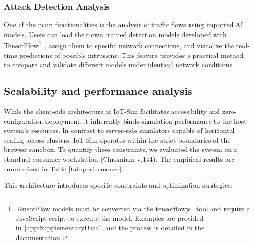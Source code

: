\subsubsection{Attack Detection Analysis}
\label{subsubsec:AttackDetectionAnalysis}
One of the main functionalities is the analysis of traffic flows using imported AI models. Users can load their own trained detection models developed with TensorFlow\footnote{TensorFlow models must be converted via the tensorflowjs~\cite{tensorflowjs} tool and require a JavaScript script to execute the model. Examples are provided in~\ref{app:SupplementaryData}, and the process is detailed in the documentation.}~\cite{tensorflow}, assign them to specific network connections, and visualize the real-time predictions of possible intrusions. This feature provides a practical method to compare and validate different models under identical network conditions.

\subsection{Scalability and performance analysis}
\label{subsec:ScalabilityPerformance}
While the client-side architecture of IoT-Sim facilitates accessibility and zero-configuration deployment, it inherently binds simulation performance to the host system's resources. In contrast to server-side simulators capable of horizontal scaling across clusters, IoT-Sim operates within the strict boundaries of the browser sandbox. To quantify these constraints, we evaluated the system on a standard consumer workstation (Chromium v.144). The empirical results are summarized in Table \ref{tab:performance}.

This architecture introduces specific constraints and optimization strategies:

